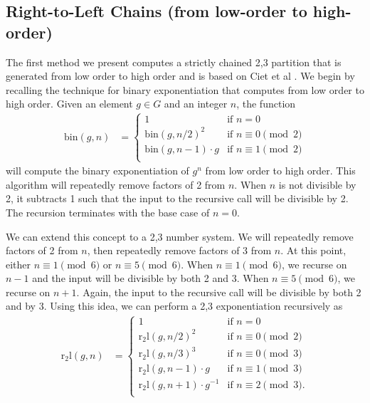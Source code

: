 \documentclass{ucalgthes1}
\theoremstyle{plain}
\theoremstyle{definition}
\begin{document}
\bigbreak
\subsection{Right-to-Left Chains (from low-order to high-order)}
\label{subsec:rtolchains}

The first method we present computes a strictly chained 2,3 partition that is generated from low order to high order and is based on Ciet et al \cite{Ciet2006}.  We begin by recalling the technique for binary exponentiation that computes from low order to high order.  Given an element $g \in G$ and an integer $n$, the function
\begin{align*}
\textrm{bin}(g, n) &= \begin{cases}
               1 & \textrm{if $n = 0$} \\
               {\textrm{bin}(g, n/2)}^2 & \textrm{if $n \equiv 0 \pmod 2$} \\
               \textrm{bin}(g, n-1) \cdot g & \textrm{if $n \equiv 1 \pmod 2$} \\
	       \end{cases}
\end{align*}
will compute the binary exponentiation of $g^n$ from low order to high order. This algorithm will repeatedly remove factors of 2 from $n$.  When $n$ is not divisible by 2, it subtracts 1 such that the input to the recursive call will be divisible by 2.  The recursion terminates with the base case of $n=0$.

We can extend this concept to a 2,3 number system.  We will repeatedly remove factors of 2 from $n$, then repeatedly remove factors of 3 from $n$.  At this point, either $n \equiv 1 \pmod 6$ or $n \equiv 5 \pmod 6$.  When $n \equiv 1 \pmod 6$, we recurse on $n-1$ and the input will be divisible by both 2 and 3.  When $n \equiv 5 \pmod 6$, we recurse on $n+1$.  Again, the input to the recursive call will be divisible by both 2 and by 3.  Using this idea, we can perform a 2,3 exponentiation recursively as
\newcommand{\rtol}{\textrm{r}_2\textrm{l}}
\begin{align*}
\rtol(g, n) &= \begin{cases}
               1 & \textrm{if $n = 0$} \\
               {\rtol(g, n/2)}^2 & \textrm{if $n \equiv 0 \pmod 2$} \\
               {\rtol(g, n/3)}^3 & \textrm{if $n \equiv 0 \pmod 3$} \\
               \rtol(g, n-1) \cdot g & \textrm{if $n \equiv 1 \pmod 3$} \\
               \rtol(g, n+1) \cdot g^{-1} & \textrm{if $n \equiv 2 \pmod 3$}. \\
	       \end{cases}
\end{align*}
\end{document}

